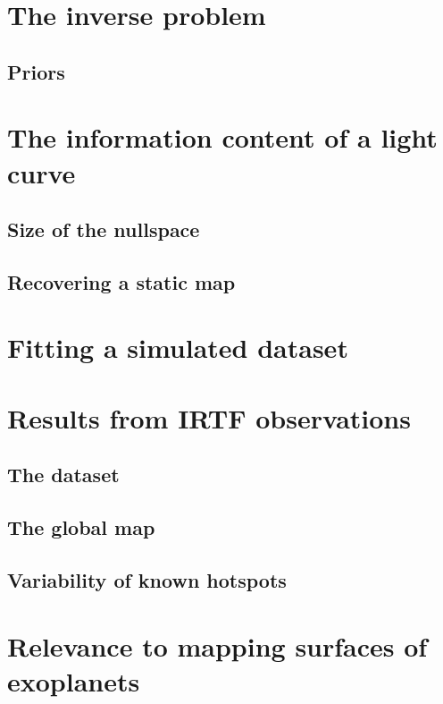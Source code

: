 \documentclass[modern]{aastex62}
\begin{document}
\section{The inverse problem}
\subsection{Priors}
\section{The information content of a light curve}
\subsection{Size of the nullspace}
\subsection{Recovering a static map}
\section{Fitting a simulated dataset}
\section{Results from IRTF observations}
\subsection{The dataset}
\subsection{The global map}
\subsection{Variability of known hotspots}
\section{Relevance to mapping surfaces of exoplanets}
\end{document}
